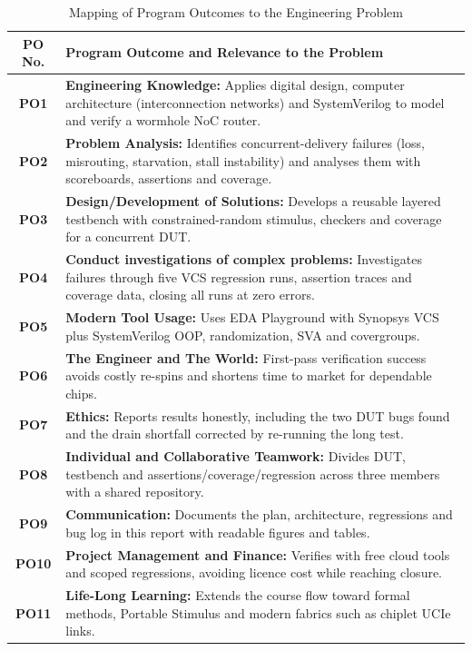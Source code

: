 \documentclass[11pt,a4paper]{report}  %
\begin{document}
\begin{table}
    \centering
    \renewcommand{\arraystretch}{1.4}
    \setlength{\tabcolsep}{8pt}
    \caption{Mapping of Program Outcomes to the Engineering Problem}
    \begin{tabular}{|c|p{13cm}|}
        \hline
        \textbf{PO No.} & \textbf{Program Outcome and Relevance to the Problem} \\
        \hline
        \textbf{PO1} & \textbf{Engineering Knowledge:} Applies digital design, computer architecture (interconnection networks) and SystemVerilog to model and verify a wormhole NoC router. \\
        \hline
        \textbf{PO2} & \textbf{Problem Analysis:} Identifies concurrent-delivery failures (loss, misrouting, starvation, stall instability) and analyses them with scoreboards, assertions and coverage. \\
        \hline
        \textbf{PO3} & \textbf{Design/Development of Solutions:} Develops a reusable layered testbench with constrained-random stimulus, checkers and coverage for a concurrent DUT. \\
        \hline
        \textbf{PO4} & \textbf{Conduct investigations of complex problems:} Investigates failures through five VCS regression runs, assertion traces and coverage data, closing all runs at zero errors. \\
        \hline
        \textbf{PO5} & \textbf{Modern Tool Usage:} Uses EDA Playground with Synopsys VCS plus SystemVerilog OOP, randomization, SVA and covergroups. \\
        \hline
        \textbf{PO6} & \textbf{The Engineer and The World:} First-pass verification success avoids costly re-spins and shortens time to market for dependable chips. \\
        \hline
        \textbf{PO7} & \textbf{Ethics:} Reports results honestly, including the two DUT bugs found and the drain shortfall corrected by re-running the long test. \\
        \hline
        \textbf{PO8} & \textbf{Individual and Collaborative Teamwork:} Divides DUT, testbench and assertions/coverage/regression across three members with a shared repository. \\
        \hline
        \textbf{PO9} & \textbf{Communication:} Documents the plan, architecture, regressions and bug log in this report with readable figures and tables. \\
        \hline
        \textbf{PO10} & \textbf{Project Management and Finance:} Verifies with free cloud tools and scoped regressions, avoiding licence cost while reaching closure. \\
        \hline
        \textbf{PO11} & \textbf{Life-Long Learning:} Extends the course flow toward formal methods, Portable Stimulus and modern fabrics such as chiplet UCIe links. \\
        \hline
    \end{tabular}
    \label{tab:po_mapping}
\end{table}
\end{document}
